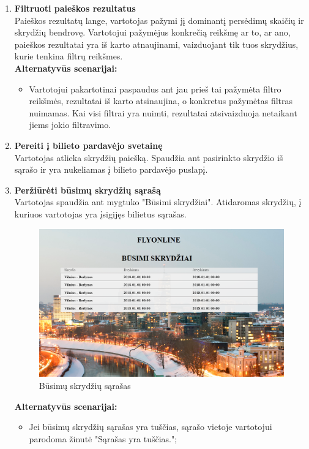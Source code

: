 \documentclass{VUMIFPSkursinis}
\begin{document}
\begin{enumerate}[label=\textbf{U\arabic*}.]
                    \item \textbf{Filtruoti paieškos rezultatus}\\
                    Paieškos rezultatų lange, vartotojas pažymi jį dominantį persėdimų skaičių ir skrydžių bendrovę. Vartotojui pažymėjus konkrečią reikšmę ar to, ar ano, paieškos rezultatai yra iš karto atnaujinami, vaizduojant tik tuos skrydžius, kurie tenkina filtrų reikšmes.
                    \\\textbf{Alternatyvūs scenarijai:}
                    \begin{itemize}
                        \item Vartotojui pakartotinai paspaudus ant jau prieš tai pažymėta filtro reikšmės, rezultatai iš karto atsinaujina, o konkretus pažymėtas filtras nuimamas. Kai visi filtrai yra nuimti, rezultatai atsivaizduoja netaikant jiems jokio filtravimo.
                    \end{itemize}

                    \item \textbf{Pereiti į bilieto pardavėjo svetainę}\\
                    Vartotojas atlieka skrydžių paiešką. Spaudžia ant pasirinkto skrydžio iš sąrašo ir yra nukeliamas į bilieto pardavėjo puslapį.

                    \item \textbf{Peržiūrėti būsimų skrydžių sąrašą}\\
                    Vartotojas spaudžia ant mygtuko "Būsimi skrydžiai". Atidaromas skrydžių, į kuriuos vartotojas yra įsigijęs bilietus sąrašas.
                    \begin{figure}[H]	
                        \centering
                        \includegraphics[scale=0.4]{img/history}	
                        \caption{Būsimų skrydžių sąrašas}	
                        \label{Būsimų skrydžių sąrašas}	
                    \end{figure}
                    \textbf{Alternatyvūs scenarijai:}
                    \begin{itemize}
                        \item Jei būsimų skrydžių sąrašas yra tuščias, sąrašo vietoje vartotojui parodoma žinutė "Sąrašas yra tuščias.";
                    \end{itemize}


\end{enumerate}
\end{document}
